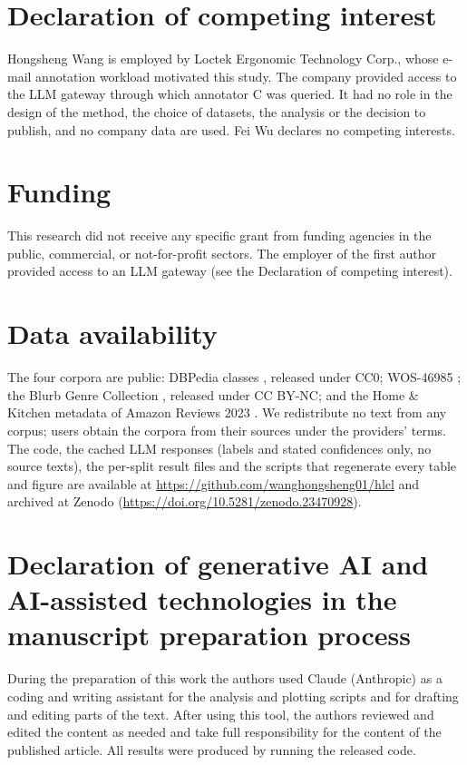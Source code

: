 \documentclass[preprint,12pt]{elsarticle}
\theoremstyle{definition}
\begin{document}
\section*{Declaration of competing interest}
Hongsheng Wang is employed by Loctek Ergonomic Technology Corp., whose e-mail
annotation workload motivated this study. The company provided access to the LLM
gateway through which annotator C was queried. It had no role in the design of the
method, the choice of datasets, the analysis or the decision to publish, and no
company data are used. Fei Wu declares no competing interests.

\section*{Funding}
This research did not receive any specific grant from funding agencies in the public, commercial, or not-for-profit sectors. The employer of the
first author provided access to an LLM gateway (see the Declaration of competing interest).

\section*{Data availability}
The four corpora are public: DBPedia classes \citep{dbpediaclasses2022data},
released under CC0; WOS-46985 \citep{kowsari2018wosdata}; the Blurb Genre
Collection \citep{bgc2019data}, released under CC BY-NC; and the Home \&
Kitchen metadata of Amazon Reviews 2023 \citep{amazonreviews2023data}. We redistribute no text
from any corpus; users obtain the corpora from their sources under the
providers' terms. The code, the cached LLM responses (labels and stated
confidences only, no source texts), the per-split result files and the scripts
that regenerate every table and figure are available at
\url{https://github.com/wanghongsheng01/hlcl} and archived at Zenodo
(\url{https://doi.org/10.5281/zenodo.23470928}).

\section*{Declaration of generative AI and AI-assisted technologies in the manuscript preparation process}
During the preparation of this work the authors used Claude (Anthropic) as a
coding and writing assistant for the analysis and plotting scripts and for
drafting and editing parts of the text. After using this tool, the authors
reviewed and edited the content as needed and take full responsibility for the
content of the published article. All results were produced by running the
released code.
\end{document}
